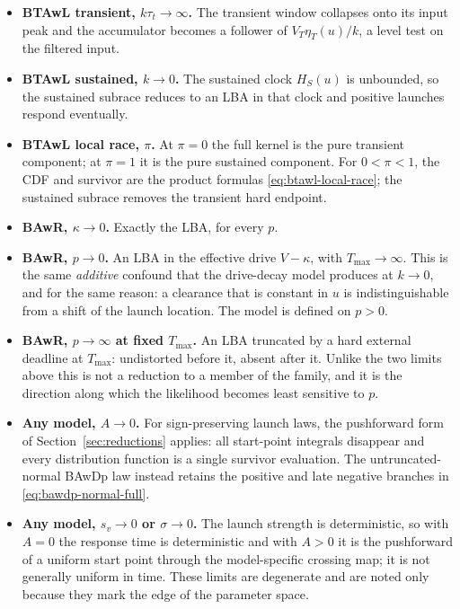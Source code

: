 \documentclass[12pt]{article}
\theoremstyle{remark}
\begin{document}
\begin{itemize}
  \item \textbf{BTAwL transient, $k\tau_t \to \infty$.} The transient window collapses onto its input peak and the accumulator becomes a follower of $V_T\eta_T(u)/k$, a level test on the filtered input.
  \item \textbf{BTAwL sustained, $k \to 0$.} The sustained clock $H_S(u)$ is unbounded, so the sustained subrace reduces to an LBA in that clock and positive launches respond eventually.
  \item \textbf{BTAwL local race, $\pi$.} At $\pi=0$ the full kernel is the pure transient component; at $\pi=1$ it is the pure sustained component. For $0<\pi<1$, the CDF and survivor are the product formulas
        \eqref{eq:btawl-local-race}; the sustained subrace removes the
        transient hard endpoint.
  \item \textbf{BAwR, $\kappa \to 0$.} Exactly the LBA, for every $p$.
  \item \textbf{BAwR, $p \to 0$.} An LBA in the effective drive $V-\kappa$, with $T_{\max}\to\infty$. This is the same \emph{additive} confound that the drive-decay model produces at $k\to0$, and for the same reason: a clearance that is constant in $u$ is indistinguishable from a shift of the launch location. The model is defined on $p>0$.
  \item \textbf{BAwR, $p \to \infty$ at fixed $T_{\max}$.} An LBA truncated by a hard external deadline at $T_{\max}$: undistorted before it, absent after it. Unlike the two limits above this is not a reduction to a member of the family, and it is the direction along which the likelihood becomes least sensitive to $p$.
  \item \textbf{Any model, $A \to 0$.} For sign-preserving launch laws, the pushforward form of Section~\ref{sec:reductions} applies: all start-point integrals disappear and every distribution function is a single survivor evaluation. The untruncated-normal BAwDp law instead retains the positive and late negative branches in
        \eqref{eq:bawdp-normal-full}.
  \item \textbf{Any model, $s_v \to 0$ or $\sigma \to 0$.} The launch strength is deterministic, so with $A = 0$ the response time is deterministic and with $A > 0$ it is the pushforward of a uniform start point through the model-specific crossing map; it is not generally uniform in time. These limits are degenerate and are noted only because they mark the edge of the parameter space.
\end{itemize}
\end{document}
